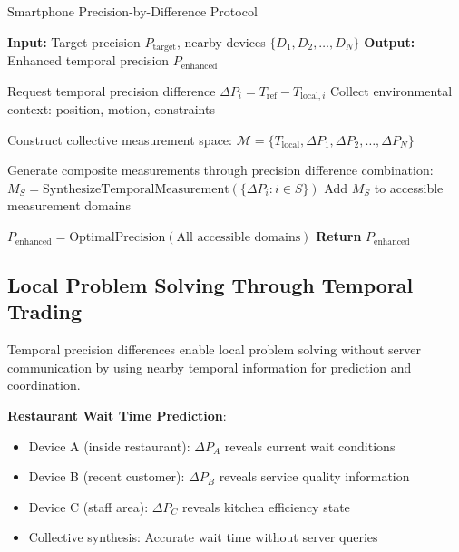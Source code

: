 \documentclass[12pt,a4paper]{article}
\begin{document}
\begin{algorithm}
\caption{Smartphone Precision-by-Difference Protocol}
\begin{algorithmic}
\State \textbf{Input:} Target precision $P_{\text{target}}$, nearby devices $\{D_1, D_2, \ldots, D_N\}$
\State \textbf{Output:} Enhanced temporal precision $P_{\text{enhanced}}$

    \State Request temporal precision difference $\Delta P_i = T_{\text{ref}} - T_{\text{local},i}$
    \State Collect environmental context: position, motion, constraints
\EndFor

\State Construct collective measurement space:
\State $\mathcal{M} = \{T_{\text{local}}, \Delta P_1, \Delta P_2, \ldots, \Delta P_N\}$

\State Generate composite measurements through precision difference combination:
        \State $M_S = \text{SynthesizeTemporalMeasurement}(\{\Delta P_i : i \in S\})$
        \State Add $M_S$ to accessible measurement domains
    \EndFor
\EndFor

\State $P_{\text{enhanced}} = \text{OptimalPrecision}(\text{All accessible domains})$
\State \textbf{Return} $P_{\text{enhanced}}$
\end{algorithmic}
\end{algorithm}

\subsection{Local Problem Solving Through Temporal Trading}

Temporal precision differences enable local problem solving without server communication by using nearby temporal information for prediction and coordination.

\textbf{Restaurant Wait Time Prediction}:
\begin{itemize}
\item Device A (inside restaurant): $\Delta P_A$ reveals current wait conditions
\item Device B (recent customer): $\Delta P_B$ reveals service quality information
\item Device C (staff area): $\Delta P_C$ reveals kitchen efficiency state
\item Collective synthesis: Accurate wait time without server queries
\end{itemize}
\end{document}
